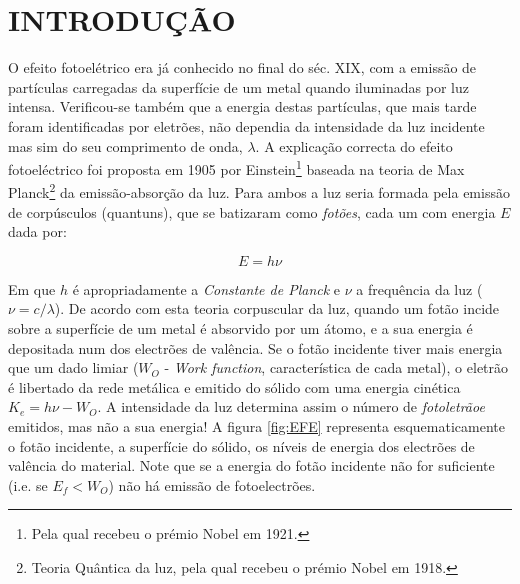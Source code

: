 \documentclass[a4paper,12pt]{article}  %
\begin{document}
\section{\sf INTRODUÇÃO }
O efeito fotoelétrico era já conhecido no final do séc. XIX, com a emissão  de partículas carregadas da superfície de um metal quando iluminadas por luz intensa. Verificou-se também que a energia destas partículas, que mais tarde foram identificadas por eletrões, não dependia da intensidade da luz incidente mas sim do  seu comprimento de onda, $\lambda$.  A explicação correcta do efeito fotoeléctrico foi proposta em 1905 por Einstein\footnote{Pela qual recebeu o prémio Nobel em 1921.} baseada na teoria de Max Planck\footnote{Teoria Quântica da luz, pela qual recebeu o prémio Nobel em 1918.} da emissão-absorção da luz. Para ambos  a luz seria formada pela emissão de  corpúsculos (quantuns), que se batizaram como \emph{fotões}, cada um com energia $E$  dada por:

\begin{equation}
	\label{eq:energia2}
	E = h \nu %
\end{equation}

Em que $h$ é apropriadamente a \emph{Constante de Planck} e $\nu$ a frequência da luz ($\nu=c/\lambda$).  
De acordo com esta teoria corpuscular da luz, quando um fotão incide sobre a superfície de um metal é absorvido por um átomo, e a sua energia é depositada num dos electrões de valência.
 Se o fotão incidente tiver mais energia que um dado limiar ($W_O$ - \emph{Work function}, característica de cada metal), o  eletrão é libertado da rede metálica e emitido do sólido com uma energia cinética $K_e = h\nu - W_O$.
A intensidade da luz determina assim o número de \emph{fotoletrãoe} emitidos, mas não a sua energia!
A figura \ref{fig:EFE}   representa esquematicamente o fotão incidente, a superfície do sólido, os níveis de energia dos electrões de valência do material. Note que se a energia do fotão incidente não for suficiente (i.e. se $E_f < W_O$) não há emissão de fotoelectrões.
\end{document}
